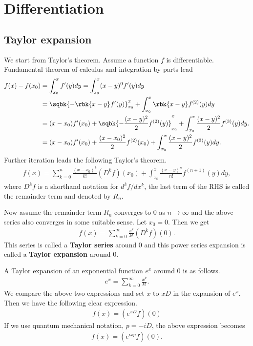 \documentclass[openany, a4paper, oneside]{jsbook}
\begin{document}
\section{Differentiation}

\subsection{Taylor expansion}

We start from Taylor's theorem.
Assume a function $f$ is differentiable.
Fundamental theorem of calculus and integration by parts lead
\begin{align}
 f(x) - f(x_0)
 &=
 \int_{x_0}^{x} f'(y) dy
 =
 \int_{x_0}^x (x - y)^{0} f'(y) dy \\
 &=
 \sqbk{- \rbk{x - y} f'(y)}_{x_0}^x + \int_{x_0}^x \rbk{x - y} f^{(2)} (y) dy \\
 &=
 (x - x_0) f'(x_0) + \sqbk{- \frac{(x-y)^2}{2} f^{(2)}(y)}_{x_0}^x + \int_{x_0}^x \frac{(x - y)^2}{2} f^{(3)} (y)dy. \\
 &=
 (x - x_0) f'(x_0) + \frac{(x-x_0)^2}{2} f^{(2)}(x_0) + \int_{x_0}^x \frac{(x - y)^2}{2} f^{(3)} (y)dy.
\end{align}
Further iteration leads the following Taylor's theorem.
\begin{align}
 f(x)
 =
 \sum_{k=0}^{n} \frac{(x - x_0)^k}{k!} \left( D^k f \right) (x_0) +
  \int_{x_0}^{x} \frac{(x - y)^{n}}{n!} f^{(n+1)} (y) dy,
\end{align}
where $D^k f$ is a shorthand notation for  $d^k f/ dx^k$,
the last term of the RHS is called the remainder term
and denoted by $R_n$.

Now assume the remainder term $R_n$ converges to 0 as $n \to \infty$
and the above series also converges in some suitable sense.
Let $x_0 = 0$.
Then we get
\begin{align}
 f(x)
 =
 \sum_{k=0}^{\infty} \frac{x^k}{k!} \left( D^k f \right) (0).
\end{align}
This series is called a \textbf{Taylor series} around 0 and
this power series expansion is called a \textbf{Taylor expansion} around 0.

A Taylor expansion of an exponential function $e^x$ around $0$ is as follows.
\begin{align}
 e^{x}
 =
 \sum_{k=0}^{\infty} \frac{x^k}{k!}.
\end{align}
We compare the above two expressions and
set $x$ to $x D$ in the expansion of $e^x$.
Then we have the following clear expression.
\begin{align}
 f(x)
 =
 \left( e^{xD} f \right) (0)
\end{align}
If we use quantum mechanical notation, $p = -i D$, the above expression becomes
\begin{align}
 f(x)
 =
 \left( e^{ixp} f \right) (0).
\end{align}
\end{document}
